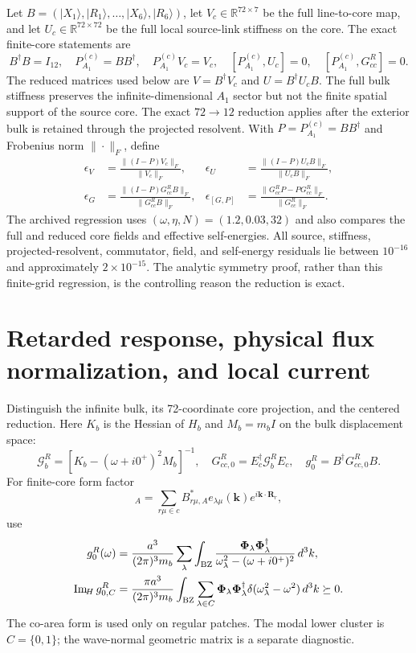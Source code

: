 \documentclass[10pt,aps,pre,onecolumn,notitlepage,nofootinbib]{revtex4-2}
\newcommand{\vk}{\bm k}
\newcommand{\vR}{\bm R}
\newcommand{\ImH}{\operatorname{Im}_{\!H}}
\begin{document}
Let $B=(|X_1\rangle,|R_1\rangle,\ldots,|X_6\rangle,|R_6\rangle)$, let $V_c\in\mathbb R^{72\times7}$ be the full line-to-core map, and let $U_c\in\mathbb R^{72\times72}$ be the full local source-link stiffness on the core.  The exact finite-core statements are
\begin{equation}
 B^{\dagger}B=I_{12},
 \quad P_{A_1}^{(c)}=BB^{\dagger},
 \quad P_{A_1}^{(c)}V_c=V_c,
 \quad [P_{A_1}^{(c)},U_c]=0,
 \quad [P_{A_1}^{(c)},G_{cc}^R]=0.
\end{equation}
The reduced matrices used below are $V=B^\dagger V_c$ and $U=B^\dagger U_cB$. The full bulk stiffness preserves the infinite-dimensional $A_1$ sector but not the finite spatial support of the source core. The exact $72\to12$ reduction applies after the exterior bulk is retained through the projected resolvent. With $P=P_{A_1}^{(c)}=BB^\dagger$ and Frobenius norm $\|\cdot\|_F$, define
\begin{align}
 \epsilon_V&=\frac{\|(I-P)V_c\|_F}{\|V_c\|_F},
 &\epsilon_U&=\frac{\|(I-P)U_cB\|_F}{\|U_cB\|_F},\\
 \epsilon_G&=\frac{\|(I-P)G_{cc}^RB\|_F}{\|G_{cc}^RB\|_F},
 &\epsilon_{[G,P]}&=\frac{\|G_{cc}^RP-PG_{cc}^R\|_F}{\|G_{cc}^R\|_F}.
\end{align}
The archived regression uses $(\omega,\eta,N)=(1.2,0.03,32)$ and also compares the full and reduced core fields and effective self-energies. All source, stiffness, projected-resolvent, commutator, field, and self-energy residuals lie between $10^{-16}$ and approximately $2\times10^{-15}$. The analytic symmetry proof, rather than this finite-grid regression, is the controlling reason the reduction is exact.

\section{Retarded response, physical flux normalization, and local current}

Distinguish the infinite bulk, its 72-coordinate core projection, and the centered reduction. Here $K_b$ is the Hessian of $H_b$ and $M_b=m_bI$ on the bulk displacement space:
\begin{equation}
 \mathcal G_b^R=[K_b-(\omega+i0^+)^2M_b]^{-1},
 \quad G_{cc,0}^R=E_c^{\dagger}\mathcal G_b^R E_c,
 \quad g_0^R=B^{\dagger}G_{cc,0}^RB.
\end{equation}
For finite-core form factor
\begin{equation}
 [\bm\Phi_\lambda(\vk)]_A
 =\sum_{r\mu\in c}B_{r\mu,A}^*e_{\lambda\mu}(\vk)e^{i\vk\cdot\vR_r},
\end{equation}
use
\begin{align}
 g_0^R(\omega)
 &=\frac{a^3}{(2\pi)^3m_b}\sum_\lambda\int_{\rm BZ}
 \frac{\bm\Phi_\lambda\bm\Phi_\lambda^{\dagger}}
 {\omega_\lambda^2-(\omega+i0^+)^2}\,d^3k,\\
 \ImH g_{0,C}^R
 &=\frac{\pi a^3}{(2\pi)^3m_b}\int_{\rm BZ}\sum_{\lambda\in C}
 \bm\Phi_\lambda\bm\Phi_\lambda^{\dagger}
 \delta(\omega_\lambda^2-\omega^2)\,d^3k\succeq0.
\end{align}
The co-area form is used only on regular patches.  The modal lower cluster is $C=\{0,1\}$; the wave-normal geometric matrix is a separate diagnostic.
\end{document}

